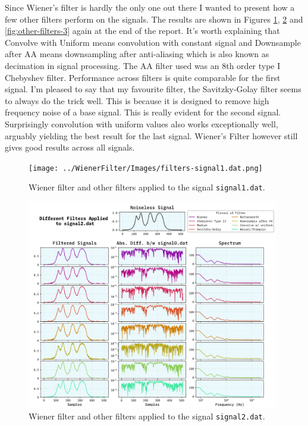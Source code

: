 \documentclass[10pt, titlepage, a4paper]{article}
\begin{document}
Since Wiener's filter is hardly the only one out there I wanted to present how a few other filters perform on the signals. The results are shown in Figures \ref{fig:other-filters-1},
\ref{fig:other-filters-2} and \ref{fig:other-filters-3} again at the end of the report. It's worth explaining that Convolve 
with Uniform means convolution with constant signal and Downsample after AA means downsampling after anti-aliasing which is also 
known as decimation in signal processing. The AA filter used was an 8th order type I Chebyshev filter. Performance across filters 
is quite comparable for the first signal. I'm pleased to say that my favourite filter, the Savitzky-Golay filter seems to 
always do the trick well. This is because it is designed to remove high frequency noise of a base signal. This is really evident 
for the second signal. Surprisingly convolution with uniform values also works exceptionally well, arguably yielding the 
best result for the last signal. Wiener's Filter however still gives good results across all signals. \\

\begin{figure}[p]
    \centering
    \texttt{[image: ../WienerFilter/Images/filters-signal1.dat.png]}
    \caption{Wiener filter and other filters applied to the signal \texttt{signal1.dat}.}
    \label{fig:other-filters-1}
\end{figure}

\begin{figure}[p]
    \centering
    \includegraphics[width=0.98\textwidth]{../WienerFilter/Images/filters-signal2.dat.png}
    \caption{Wiener filter and other filters applied to the signal \texttt{signal2.dat}.}
    \label{fig:other-filters-2}
\end{figure}
\end{document}
